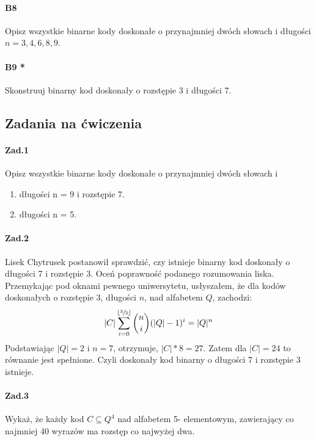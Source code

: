 \documentclass[a4paper,12pt]{article}
\newcommand\floor[1]{\lfloor#1\rfloor} %
\theoremstyle{definition}%
\theoremstyle{definition}
\theoremstyle{problem}
\begin{document}
\paragraph{B8} Opisz wszystkie binarne kody doskonałe o przynajmniej dwóch słowach i długości $n = 3, 4, 6, 8, 9$.

\paragraph{B9 *} Skonstruuj binarny kod doskonały o rozstępie 3 i długości 7.

\subsection{Zadania na ćwiczenia}
\paragraph{Zad.1} Opisz wszystkie binarne kody doskonałe o przynajmniej dwóch słowach i
\begin{enumerate}[label=\alph*)]
\item długości n = 9 i rozstępie 7.
\item długości n = 5.
\end{enumerate}


\paragraph{Zad.2} Lisek Chytrusek postanowił sprawdzić, czy istnieje binarny kod doskonały o długości 7 i rozstępie 3. Oceń poprawność podanego rozumowania liska. Przemykając pod oknami pewnego uniwersytetu, usłyszałem, że dla kodów doskonałych o rozstępie 3, długości $n$, nad alfabetem $Q$, zachodzi: $$|C| \sum ^{\floor{\sfrac{3}{2}}}_{i=0}\binom{n}{i}(|Q| - 1)^i = |Q|^n$$Podstawiając $|Q| = 2$ i $n = 7$, otrzymuje, $|C|* 8 = 27$. Zatem dla $|C| = 24$ to równanie jest spełnione. Czyli doskonały kod binarny o długości $7$ i rozstępie $3$ istnieje.

\paragraph{Zad.3} Wykaż, że każdy kod $C \subseteq Q^4$ nad alfabetem 5- elementowym, zawierający co najmniej 40 wyrazów ma rozstęp co najwyżej dwa.
\end{document}
